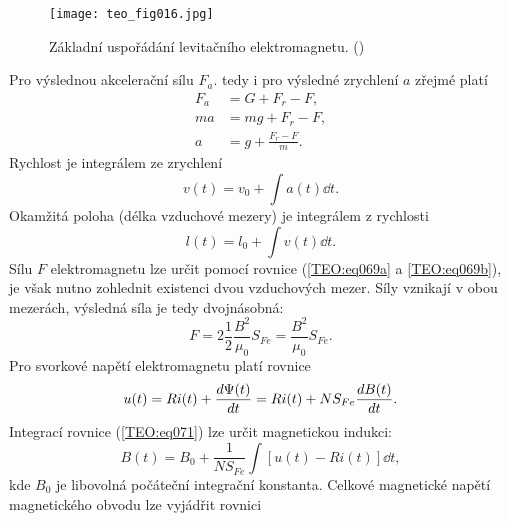       \begin{figure}[ht!]  %
        \centering
        \texttt{[image: teo\_fig016.jpg]}
        \caption{Základní uspořádání levitačního elektromagnetu.
                 (\cite[s.~16]{Patocka4})}
        \label{teo:fig016}
      \end{figure}
      Pro výslednou akcelerační sílu \(F_a\). tedy i pro výsledné zrychlení \(a\) zřejmé platí
      \begin{subequations}
      \label{TEO:eq063}
        \begin{align}
          F_a &= G + F_r - F,             \label{TEO:eq063a} \\
          ma  &= mg + F_r - F,            \label{TEO:eq063b} \\
          a   &= g + \frac{F_r -F}{m}.    \label{TEO:eq063c}
        \end{align}
      \end{subequations}
      Rychlost je integrálem ze zrychlení
      \begin{equation}\label{TEO:eq066}
        v(t) = v_0 + \int{a(t)\dd{t}}.
      \end{equation}
      Okamžitá poloha (délka vzduchové mezery) je integrálem z rychlosti
      \begin{equation}\label{TEO:eq067}
        l(t) = l_0 + \int{v(t)\dd{t}}.
      \end{equation}
      Sílu \(F\) elektromagnetu lze určit pomocí rovnice (\ref{TEO:eq069a} a \ref{TEO:eq069b}), je 
      však nutno zohlednit existenci dvou vzduchových mezer. Síly vznikají v obou mezerách, 
      výsledná síla je tedy dvojnásobná:
      \begin{equation}\label{TEO:eq070}
        F = 2\frac{1}{2}\frac{B^2}{\mu_0}S_{Fe} = \frac{B^2}{\mu_0}S_{Fe}.
      \end{equation}
      Pro svorkové napětí elektromagnetu platí rovnice
      \begin{equation}\label{TEO:eq071}
        u(t) = Ri(t) + \dfrac{d \Psi(t)}{d t} = Ri(t) + NS_{Fe}\dfrac{d B(t)}{d t}.
      \end{equation} 
      Integrací rovnice (\ref{TEO:eq071}) lze určit magnetickou indukci:
      \begin{equation}\label{TEO:eq072}
      B(t) = B_0 + \frac{1}{NS_{Fe}}\int\left[u(t) - Ri(t)\right]\dd{t},
      \end{equation}
      kde \(B_0\) je libovolná počáteční integrační konstanta. Celkové magnetické napětí 
      magnetického obvodu lze vyjádřit rovnici
